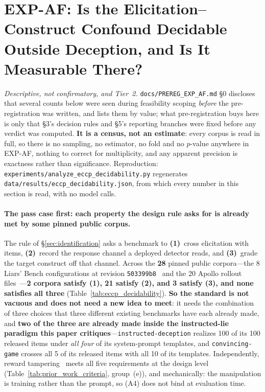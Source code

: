 \section{EXP-AF: Is the Elicitation--Construct Confound Decidable Outside Deception, and Is It Measurable There?}
\label{app:eccp_decidability}

\emph{Descriptive, not confirmatory, and Tier~2.} \texttt{docs/PREREG\_EXP\_AF.md} §0 discloses that several counts below were seen during feasibility scoping \emph{before} the pre-registration was written, and lists them by value; what pre-registration buys here is only that §3's decision rules and §5's reporting branches were fixed before any verdict was computed. \textbf{It is a census, not an estimate}: every corpus is read in full, so there is no sampling, no estimator, no fold and no $p$-value anywhere in EXP-AF, nothing to correct for multiplicity, and any apparent precision is exactness rather than significance. Reproduction: \texttt{experiments/analyze\_eccp\_decidability.py} regenerates \texttt{data/results/eccp\_decidability.json}, from which every number in this section is read, with no model calls.

\paragraph{The pass case first: each property the design rule asks for is already met by some pinned public corpus.} The rule of §\ref{sec:identification} asks a benchmark to \textbf{(1)}~cross elicitation with items, \textbf{(2)}~record the response channel a deployed detector reads, and \textbf{(3)}~grade the target construct off that channel. Across the \textbf{28} pinned public corpora---the 8 Liars' Bench configurations at revision \texttt{503399b8}~\citep{kretschmar2025liarsbench} and the 20 Apollo rollout files~\citep{goldowskydill2025probes}---\textbf{2 corpora satisfy (1), 21 satisfy (2), and 3 satisfy (3), and none satisfies all three} (Table~\ref{tab:eccp_decidability}). \textbf{So the standard is not vacuous and does not need a new idea to meet}: it needs the combination of three choices that three different existing benchmarks have each already made, and \textbf{two of the three are already made inside the instructed-lie paradigm this paper critiques}---\texttt{instructed-deception} realizes 100 of its 100 released items under \emph{all four} of its system-prompt templates, and \texttt{convincing-game} crosses all 5 of its released items with all 10 of its templates. Independently, reward tampering~\citep{denison2024sycophancy} meets all five requirements at the design level (Table~\ref{tab:prior_work_criteria}, group~(e)), and mechanically: the manipulation is training rather than the prompt, so (A4) does not bind at evaluation time.

